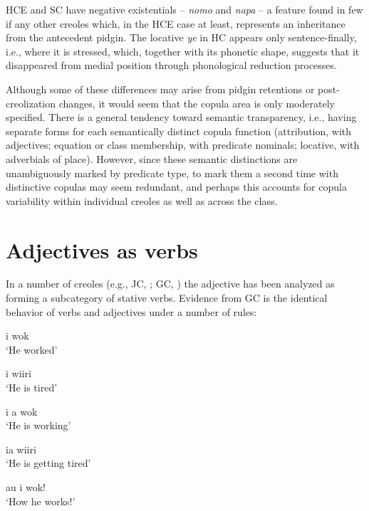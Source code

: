 \z

\z
HCE and SC have negative existentials -- \textit{nomo} and \textit{napa} -- a feature found in few if any other creoles which, in the HCE case at least, represents an inheritance from the antecedent pidgin. The locative \textit{ye} in HC appears only sentence-finally, i.e., where it is stressed, which, together with its phonetic shape, suggests that it disappeared from medial position through phonological reduction processes.


Although some of these differences may arise from pidgin retentions or post-creolization changes, it would seem that the copula area is only moderately specified. There is a general tendency toward semantic transparency, i.e., having separate forms for each semantically distinct copula function (attribution, with adjectives; equation or class membership, with predicate nominals; locative, with adverbials of place). However, since these semantic distinctions are unambiguously marked by predicate type, to mark them a second time with distinc\-tive copulas may seem redundant, and perhaps this accounts for copula variability within individual creoles as well as across the class.

\section{Adjectives as verbs}

In a number of creoles (e.g., JC, \citealt{Bailey1966}; GC, \citealt{Bickerton1973a}) the adjective has been analyzed as forming a subcategory of stative verbs. Evidence from GC is the identical behavior of verbs and adjectives under a number of rules:

\ea\label{ex:2:63}
 {i} {wok}\\
\glt `He worked'
\z

\ea\label{ex:2:64}
 i wiiri\\
\glt `He is tired'
\z

\ea\label{ex:2:65}
i a wok\\
\glt `He is working'
\z

\ea\label{ex:2:66}
ia {wiiri}\\
\glt `He is getting tired'
\z

\ea\label{ex:2:67}
au i wok!\\
\glt `How he works!'
\z

